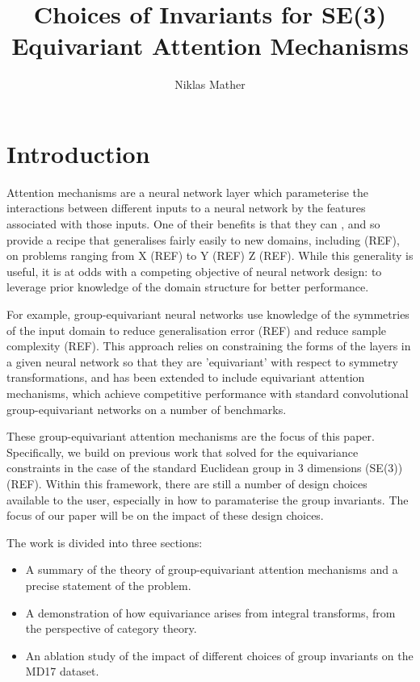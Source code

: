 \documentclass[11pt]{article}
\begin{document}
\title{Choices of Invariants for SE(3) Equivariant Attention Mechanisms}
\author{Niklas Mather}
\maketitle

\section{Introduction}

Attention mechanisms are a neural network layer which parameterise the interactions between different inputs to a neural network by the features associated with those inputs. One of their benefits is that they can , and so provide a recipe that generalises fairly easily to new domains, including  (REF), on problems ranging from X (REF) to Y (REF) Z (REF). While this generality is useful, it is at odds with a competing objective of neural network design: to leverage prior knowledge of the domain structure for better performance.

For example, group-equivariant neural networks use knowledge of the symmetries of the input domain to reduce generalisation error (REF) and reduce sample complexity (REF). This approach relies on constraining the forms of the layers in a given neural network so that they are 'equivariant' with respect to symmetry transformations, and has been extended to include equivariant attention mechanisms, which achieve competitive performance with standard convolutional group-equivariant networks on a number of benchmarks.

These group-equivariant attention mechanisms are the focus of this paper. Specifically, we build on previous work that solved for the equivariance constraints in the case of the standard Euclidean group in 3 dimensions (SE(3)) (REF). Within this framework, there are still a number of design choices available to the user, especially in how to paramaterise the group invariants. The focus of our paper will be on the impact of these design choices.

The work is divided into three sections: \begin{itemize}
	\item A summary of the theory of group-equivariant attention mechanisms and a precise statement of the problem.
	\item A demonstration of how equivariance arises from integral transforms, from the perspective of category theory.
	\item An ablation study of the impact of different choices of group invariants on the MD17 dataset. 
\end{itemize}
\end{document}
